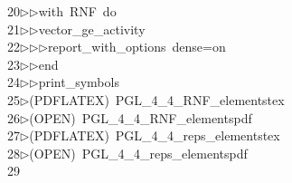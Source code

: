 \begin{tabbing}
20\>$\triangleright$\>$\triangleright$\>with\ RNF\ do\ \\[0pt]
21\>$\triangleright$\>$\triangleright$\>vector\_ge\_activity\ \\[0pt]
22\>$\triangleright$\>$\triangleright$\>$\triangleright$\>report\_with\_options\ dense=on\ \\[0pt]
23\>$\triangleright$\>$\triangleright$\>end\ \\[0pt]
24\>$\triangleright$\>$\triangleright$\>print\_symbols\\[0pt]
25\>$\triangleright$\>(PDFLATEX)\ PGL\_4\_4\_RNF\_elementstex\\[0pt]
26\>$\triangleright$\>(OPEN)\ PGL\_4\_4\_RNF\_elementspdf\\[0pt]
27\>$\triangleright$\>(PDFLATEX)\ PGL\_4\_4\_reps\_elementstex\\[0pt]
28\>$\triangleright$\>(OPEN)\ PGL\_4\_4\_reps\_elementspdf\\[0pt]
29\>\end{tabbing}
